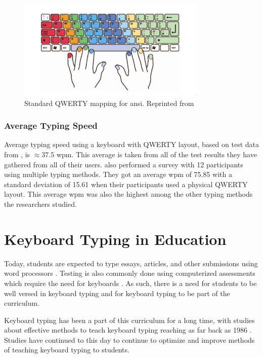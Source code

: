 \documentclass{report}
\begin{document}
\begin{figure}[H]
	\centering
	\includegraphics[width=0.8\textwidth]{touch-type.png}
	\caption{Standard QWERTY mapping for \ac{ansi}. Reprinted from }
	\label{fig:touch-type}
	\centering
\end{figure}

\subsubsection{Average Typing Speed}

Average typing speed using a keyboard with QWERTY layout, based on test data
from \cite{keybr}, is $\approx37.5$ \ac{wpm}. This average is taken from all of
the test results they have gathered from all of their users.
\cite{arif2009} also performed a survey with 12 participants using
multiple typing methods. They got an average \ac{wpm} of 75.85 with a standard
deviation of 15.61 when their participants used a physical QWERTY layout. This
average \ac{wpm} was also the highest among the other typing methods the
researchers studied.

\section{Keyboard Typing in Education}

Today, students are expected to type essays, articles, and other submissions
using word processors \parencite{poole2016}. Testing is also commonly done using
computerized assessments which require the need for keyboards
\parencite{moodle}. As such, there is a need for students to be well versed in
keyboard typing and for keyboard typing to be part of the curriculum.

Keyboard typing has been a part of this curriculum for a long time, with studies
about effective methods to teach keyboard typing reaching as far back as 1986
\parencite{hoot1986}. Studies have continued to this day to continue to optimize
and improve methods of teaching keyboard typing to students.
\end{document}
